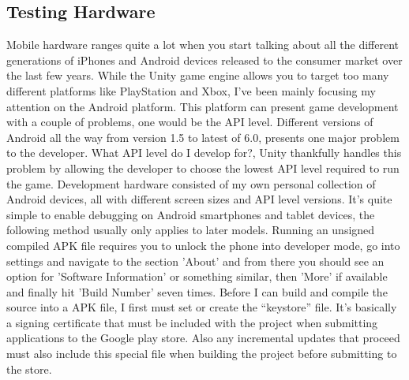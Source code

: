\subsection{Testing Hardware}
Mobile hardware ranges quite a lot when you start talking about all the different generations of iPhones and Android devices released to the consumer market over the last few years. While the Unity game engine allows you to target too many different platforms like PlayStation and Xbox, I’ve been mainly focusing my attention on the Android platform. This platform can present game development with a couple of problems, one would be the API level. Different versions of Android all the way from version 1.5 to latest of 6.0, presents one major problem to the developer. What API level do I develop for?, Unity thankfully handles this problem by allowing the developer to choose the lowest API level required to run the game.
Development hardware consisted of my own personal collection of Android devices, all with different screen sizes and API level versions. It’s quite simple to enable debugging on Android smartphones and tablet devices, the following method usually only applies to later models. Running an unsigned compiled APK file requires you to unlock the phone into developer mode, go into settings and navigate to the section 'About' and from there you should see an option for 'Software Information' or something similar, then 'More' if available and finally hit 'Build Number' seven times. Before I can build and compile the source into a APK file, I first must set or create the “keystore” file. It’s basically a signing certificate that must be included with the project when submitting applications to the Google play store. Also any incremental updates that proceed must also include this special file when building the project before submitting to the store.
